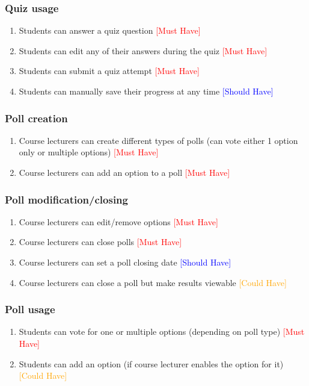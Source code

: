\subsubsection{Quiz usage}
\begin{enumerate}
	\item Students can answer a quiz question \textcolor{Red}{[Must Have]}
	\item Students can edit any of their answers during the quiz \textcolor{Red}{[Must Have]}
	\item Students can submit a quiz attempt \textcolor{Red}{[Must Have]}
	\item Students can manually save their progress at any time \textcolor{Blue}{[Should Have]}
\end{enumerate}

\subsubsection{Poll creation}
\begin{enumerate}
	\item Course lecturers can create different types of polls (can vote either 1 option only or multiple options) \textcolor{Red}{[Must Have]}
	\item Course lecturers can add an option to a poll \textcolor{Red}{[Must Have]}
\end{enumerate}

\subsubsection{Poll modification/closing}
\begin{enumerate}
	\item Course lecturers can edit/remove options \textcolor{Red}{[Must Have]}
	\item Course lecturers can close polls \textcolor{Red}{[Must Have]}
	\item Course lecturers can set a poll closing date \textcolor{Blue}{[Should Have]}
	\item Course lecturers can close a poll but make results viewable \textcolor{Orange}{[Could Have]}
\end{enumerate}

\subsubsection{Poll usage}
\begin{enumerate}
	\item Students can vote for one or multiple options (depending on poll type) \textcolor{Red}{[Must Have]}
	\item Students can add an option (if course lecturer enables the option for it) \textcolor{Orange}{[Could Have]}
\end{enumerate}


